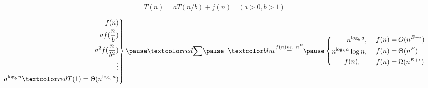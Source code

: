 
\begin{frame}{}
  \centerline{}
\end{frame}

\begin{frame}{}
  \[
    T(n) = aT(n/b) + f(n) \quad (a > 0, b > 1) 
  \]

  \pause
  \centerline{}

  \pause
  \vspace{0.30cm}
  \begin{equation*}
    \left.\begin{aligned}
      f(n) \\
      af(\frac{n}{b}) \\
      a^2f(\frac{n}{b^2}) \\
      \vdots \\
	  a^{\log_b n} \red{T}(1) = \Theta(n^{\log_b a})
    \end{aligned}\right\}
    \pause
    \red{\sum} \pause\;\; \blue{\overset{f(n) \text{\it vs. } n^{E}}{=}} \pause
	\left\{\begin{aligned}
      n^{\log_b a},		 \\
      n^{\log_b a}\log n, 	 \\
      f(n),		   \quad \\
    \end{aligned}\right.
    \quad \left.\begin{aligned}
      f(n) &= O(n^{E-\epsilon}) \\
      f(n) &= \Theta(n^E) \\
      f(n) &= \Omega(n^{E+\epsilon}) 
    \end{aligned}\right.
  \end{equation*}
\end{frame}

